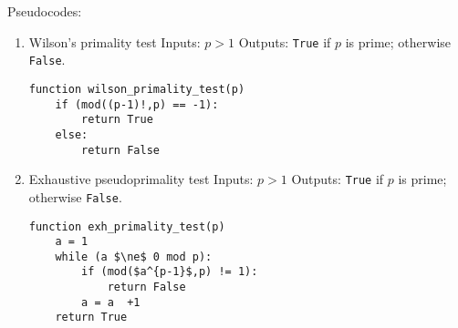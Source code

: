 \documentclass[10pt,a4paper,final]{article}
\newcommand{\False}[0]{\texttt{False}}
\newcommand{\True}[0]{\texttt{True}}
\begin{document}
Pseudocodes:
\begin{enumerate}
	\item Wilson's primality test
	Inputs: $p > 1$
	Outputs: \True{} if $p$ is prime; otherwise \False{}.
\begin{lstlisting}
function wilson_primality_test(p)
	if (mod((p-1)!,p) == -1):
		return True
	else:
		return False
\end{lstlisting}

	\item Exhaustive pseudoprimality test
	Inputs: $p > 1$
	Outputs: \True{} if $p$ is prime; otherwise \False{}.
\begin{lstlisting}
function exh_primality_test(p)
	a = 1
	while (a $\ne$ 0 mod p):
		if (mod($a^{p-1}$,p) != 1):
			return False
		a = a  +1
	return True
\end{lstlisting}
\end{enumerate}



\end{document}
